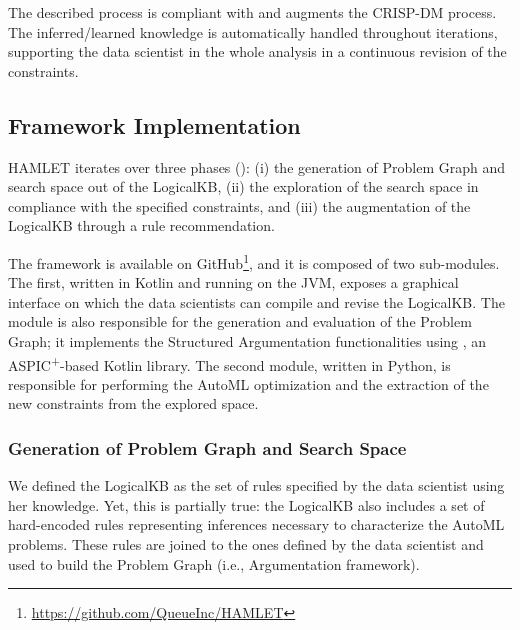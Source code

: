 The described process is compliant with and augments the CRISP-DM process.
The inferred/learned knowledge is automatically handled throughout iterations, supporting the data scientist in the whole analysis in a continuous revision of the constraints.
\vspace{2cm}

\subsection{Framework Implementation}\label{hamlet-ssec:implementation}

HAMLET iterates over three phases (): (i) the generation of Problem Graph and search space out of the LogicalKB, (ii) the exploration of the search space in compliance with the specified constraints, and (iii) the augmentation of the LogicalKB through a rule recommendation.

The framework is available on GitHub\footnote{\url{https://github.com/QueueInc/HAMLET}}, and it is composed of two sub-modules.
The first, written in Kotlin and running on the JVM, exposes a graphical interface on which the data scientists can compile and revise the LogicalKB.
The module is also responsible for the generation and evaluation of the Problem Graph; it implements the Structured Argumentation functionalities using \argtup{} \cite{arg2p-jlc}, an ASPIC\textsuperscript{+}-based Kotlin library.
The second module, written in Python, is responsible for performing the AutoML optimization and the extraction of the new constraints from the explored space.

\subsubsection{Generation of Problem Graph and Search Space}
We defined the LogicalKB as the set of rules specified by the data scientist using her knowledge.
Yet, this is partially true: the LogicalKB also includes a set of hard-encoded rules representing inferences necessary to characterize the AutoML problems.
These rules are joined to the ones defined by the data scientist and used to build the Problem Graph (i.e., Argumentation framework).

